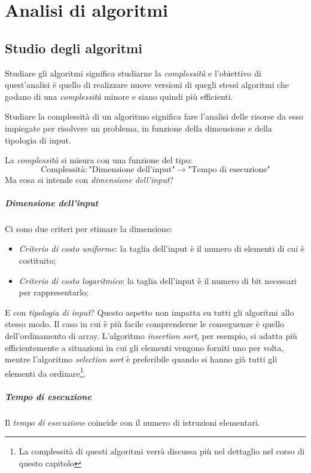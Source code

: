 \chapter{Analisi di algoritmi}

\section{Studio degli algoritmi}
Studiare gli algoritmi significa studiarne la \emph{complessità} e l'obiettivo
di quest'analisi è quello di realizzare nuove versioni di quegli stessi
algoritmi che godano di una \emph{complessità} minore e siano quindi più
efficienti.

\begin{definition}
    Studiare la complessità di un algoritmo significa fare l'analisi delle risorse
    da esso impiegate per risolvere un problema, in funzione della
    dimensione e della tipologia di input.
\end{definition}\noindent
La \emph{complessità} si misura con una funzione del tipo:
\[\text{Complessità}:\text{"Dimensione dell'input"}\rightarrow
\text{"Tempo di esecuzione"}\]
Ma cosa si intende con \emph{dimensione dell'input}?

\paragraph{Dimensione dell'input}
Ci sono due criteri per stimare la dimensione:
\begin{itemize}
    \item \emph{Criterio di costo uniforme}: la taglia dell’input è il numero
    di elementi di cui è costituito;
    \item \emph{Criterio di costo logaritmico}: la taglia dell’input è il
    numero di bit necessari per rappresentarlo;
\end{itemize}
E con \emph{tipologia di input}?
Questo aspetto non impatta su tutti gli algoritmi allo stesso modo. Il caso in
cui è più facile comprenderne le conseguenze è quello dell'ordinamento di array.
L'algoritmo \emph{insertion sort}, per esempio, si adatta più efficientemente
a situazioni in cui gli elementi vengono forniti uno per volta, mentre l'algoritmo
\emph{selection sort} è preferibile quando si hanno già tutti gli elementi
da ordinare\footnote{La complessità di questi algoritmi verrà discussa più nel
dettaglio nel corso di questo capitolo}.

\paragraph{Tempo di esecuzione}
Il \emph{tempo di esecuzione} coincide con il numero di istruzioni elementari.

